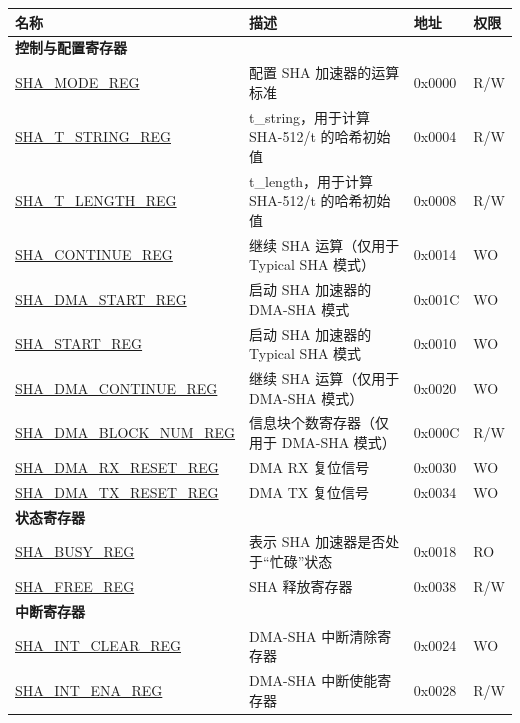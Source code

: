 \begin{longtable}{ | l| p{7.5cm} | p{1.3cm} | p{1cm} | }
\hline\rowcolor{lightgray}
\textbf{名称} & \textbf{描述} &\textbf{地址} & \textbf{权限} \\ \hline
\endhead
\multicolumn{4}{|l|}{\textbf{控制与配置寄存器}} \\ \hline
\hyperref[regdesc:SHAMODEREG]{SHA\_MODE\_REG} & 配置 SHA 加速器的运算标准 & 0x0000 & R/W \\\hline
\hyperref[regdesc:SHATSTRINGREG]{SHA\_T\_STRING\_REG} & t\_string，用于计算 SHA-512/t 的哈希初始值 & 0x0004 & R/W \\ \hline
\hyperref[regdesc:SHATLENGTHREG]{SHA\_T\_LENGTH\_REG} &  t\_length，用于计算 SHA-512/t 的哈希初始值  & 0x0008 & R/W \\ \hline
\hyperref[regdesc:SHACONTINUEREG]{SHA\_CONTINUE\_REG} & 继续 SHA 运算（仅用于 Typical SHA 模式） & 0x0014 & WO \\ \hline
\hyperref[regdesc:SHADMASTARTREG]{SHA\_DMA\_START\_REG} & 启动 SHA  加速器的 DMA-SHA 模式 & 0x001C & WO \\ \hline
\hyperref[regdesc:SHASTARTREG]{SHA\_START\_REG} & 启动 SHA 加速器的 Typical SHA 模式 & 0x0010 & WO \\ \hline
\hyperref[regdesc:SHADMACONTINUEREG]{SHA\_DMA\_CONTINUE\_REG} & 继续 SHA 运算（仅用于 DMA-SHA 模式） & 0x0020 & WO \\ \hline
\hyperref[regdesc:SHADMABLOCKNUMREG]{SHA\_DMA\_BLOCK\_NUM\_REG} & 信息块个数寄存器（仅用于 DMA-SHA 模式） & 0x000C & R/W \\ \hline
\hyperref[regdesc:SHADMARXRESETREG]{SHA\_DMA\_RX\_RESET\_REG} & DMA RX 复位信号 & 0x0030 & WO \\ \hline
\hyperref[regdesc:SHADMATXRESETREG]{SHA\_DMA\_TX\_RESET\_REG} & DMA TX 复位信号 & 0x0034 & WO \\ \hline
\multicolumn{4}{|l|}{\textbf{状态寄存器}} \\ \hline
\hyperref[regdesc:SHABUSYREG]{SHA\_BUSY\_REG} & 表示 SHA 加速器是否处于“忙碌”状态 & 0x0018 & RO \\ \hline
\hyperref[regdesc:SHAFREEREG]{SHA\_FREE\_REG} & SHA 释放寄存器 & 0x0038 & R/W \\ \hline
\multicolumn{4}{|l|}{\textbf{中断寄存器}} \\ \hline
\hyperref[regdesc:SHAINTCLEARREG]{SHA\_INT\_CLEAR\_REG} & DMA-SHA 中断清除寄存器 & 0x0024 & WO \\ \hline
\hyperref[regdesc:SHAINTENAREG]{SHA\_INT\_ENA\_REG} & DMA-SHA 中断使能寄存器 & 0x0028 & R/W \\ \hline

\end{longtable}
